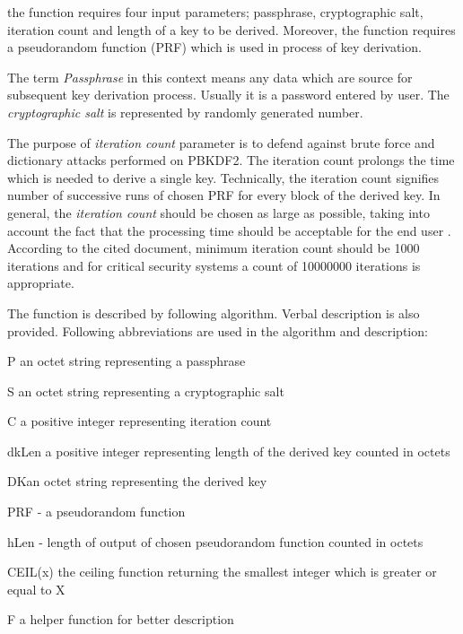 \documentclass[nolof]{fithesis3}
\begin{document}
the function requires four input parameters; passphrase, cryptographic salt, iteration count and length of a key to be derived. Moreover, the function requires a pseudorandom function (PRF) which is used in process of key derivation.

The term \emph{Passphrase} in this context means any data which are source for subsequent key derivation process. Usually it is a password entered by user. The \emph{cryptographic salt} is represented by randomly generated number.

The purpose of \emph{iteration count} parameter is to defend against brute force and dictionary attacks performed on PBKDF2. The iteration count prolongs the time which is needed to derive a single key. Technically, the iteration count signifies number of successive runs of chosen PRF for every block of the derived key. In general, the \emph{iteration count} should be chosen as large as possible, taking into account the fact that the processing time should be acceptable for the end user \parencite{nistpbkdf2}. According to the cited document, minimum iteration count should be 1000 iterations and for critical security systems a count of 10000000 iterations is appropriate. 

The function is described by following algorithm. Verbal description is also provided. Following abbreviations are used in the algorithm and description:

\begin{description}
\item{P} an octet string representing a passphrase

\item{S} an octet string representing a cryptographic salt

\item{C} a positive integer representing iteration count

\item{dkLen} a positive integer representing length of the derived key counted in octets

\item{DK}an octet string representing the derived key

\item{PRF} - a pseudorandom function

\item{hLen} - length of output of chosen pseudorandom function counted in octets

\item{CEIL(x)} the ceiling function returning the smallest integer which is greater or equal to X

\item{F} a helper function for better description
\end{description}
\end{document}
